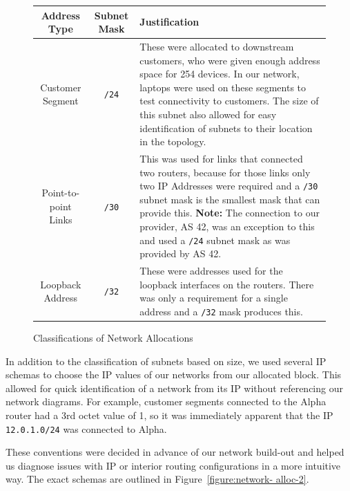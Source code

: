 \begin{figure}[!ht]
    \caption{Classifications of Network Allocations}
    \label{figure:network-alloc-1}
    \centering
    \begin{tabular}{|c|c|p{5.5cm}|}

        \hline
        \textbf{Address Type} & \textbf{Subnet Mask} & \textbf{Justification} \\

        \hline
        Customer Segment & \texttt{/24} & These were allocated to downstream
        customers, who were given enough address space for 254 devices. In our
        network, laptops were used on these segments to test connectivity to
        customers. The size of this subnet also allowed for easy identification
        of subnets to their location in the topology.\\

        \hline
        Point-to-point Links & \texttt{/30} & This was used for links that
        connected two routers, because for those links only two IP Addresses
        were required and a \texttt{/30} subnet mask is the smallest mask that
        can provide this.
        \textbf{Note:} The connection to our provider, AS 42, was an exception
        to this and used a \texttt{/24} subnet mask as was provided by AS 42.\\

        \hline
        Loopback Address & \texttt{/32} & These were addresses used for the
        loopback interfaces on the routers. There was only a requirement for a
        single address and a \texttt{/32} mask produces this.\\

        \hline
    \end{tabular}
\end{figure}
In addition to the classification of subnets based on size, we used several IP
schemas to choose the IP values of our networks from our allocated block. This
allowed for quick identification of a network from its IP without referencing
our network diagrams. For example, customer segments connected to the Alpha
router had a 3rd octet value of 1, so it was immediately apparent that the IP
\texttt{12.0.1.0/24} was connected to Alpha.

These conventions were decided in advance of our network build-out and helped
us diagnose issues with IP or interior routing configurations in a more
intuitive way. The exact schemas are outlined in Figure~\ref{figure:network-
alloc-2}.

